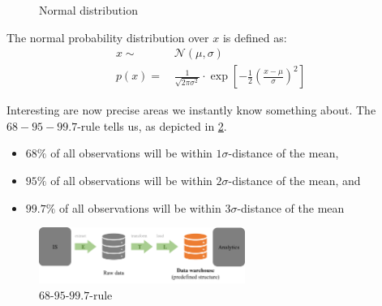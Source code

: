 \begin{figure}[H]
  \centering
  \hspace*{0.05\textwidth}
  \caption{Normal distribution}
  \label{fig:2_normal}
\end{figure}

The normal probability distribution over $x$ is defined as:
\begin{align*}
  x \sim&\, \mathcal{N}(\mu, \sigma) \\
  p(x) = &\,\frac{1}{\sqrt{2\pi \sigma^2}} \cdot \exp\left[ -\frac{1}{2}\left(\frac{x-\mu}{\sigma}\right)^2 \right]
\end{align*}

Interesting are now precise areas we instantly know something about. The $68-95-99.7$-rule tells us, as depicted in \ref{fig:2_three_sigma}.
\begin{itemize}
  \item $68\%$ of all observations will be within $1\sigma$-distance of the mean,
  \item $95\%$ of all observations will be within $2\sigma$-distance of the mean, and
  \item $99.7\%$ of all observations will be within $3\sigma$-distance of the mean
\end{itemize}

\begin{figure}[H]
  \centering
  \includegraphics[width=0.6\textwidth]{assets/basics/etl.png}%
  \caption{$68$-$95$-$99.7$-rule}
  \label{fig:2_three_sigma}
\end{figure}

